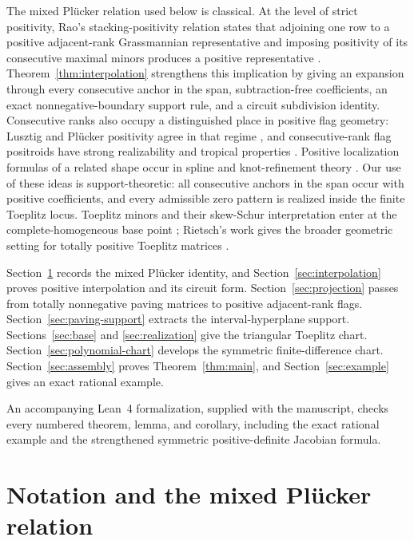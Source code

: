 \documentclass{amsart}
\numberwithin{equation}{section}
\theoremstyle{definition}
\theoremstyle{remark}
\begin{document}
The mixed Pl\"ucker relation used below is classical.  At the level of strict positivity, Rao's stacking-positivity relation states that adjoining one row to a positive adjacent-rank Grassmannian representative and imposing positivity of its consecutive maximal minors produces a positive representative \cite[Section~5.1]{Rao}.  Theorem~\ref{thm:interpolation} strengthens this implication by giving an expansion through every consecutive anchor in the span, subtraction-free coefficients, an exact nonnegative-boundary support rule, and a circuit subdivision identity.  Consecutive ranks also occupy a distinguished place in positive flag geometry: Lusztig and Pl\"ucker positivity agree in that regime \cite{BlochKarp}, and consecutive-rank flag positroids have strong realizability and tropical properties \cite{BEW}.  Positive localization formulas of a related shape occur in spline and knot-refinement theory \cite{deBoorDeVore,Lyche,Mazure}.  Our use of these ideas is support-theoretic: all consecutive anchors in the span occur with positive coefficients, and every admissible zero pattern is realized inside the finite Toeplitz locus.  Toeplitz minors and their skew-Schur interpretation enter at the complete-homogeneous base point \cite{GarciaTierz,Macdonald}; Rietsch's work gives the broader geometric setting for totally positive Toeplitz matrices \cite{Rietsch,RietschSurvey}.

Section~\ref{sec:plucker} records the mixed Pl\"ucker identity, and Section~\ref{sec:interpolation} proves positive interpolation and its circuit form.  Section~\ref{sec:projection} passes from totally nonnegative paving matrices to positive adjacent-rank flags.  Section~\ref{sec:paving-support} extracts the interval-hyperplane support.  Sections~\ref{sec:base} and \ref{sec:realization} give the triangular Toeplitz chart.  Section~\ref{sec:polynomial-chart} develops the symmetric finite-difference chart.  Section~\ref{sec:assembly} proves Theorem~\ref{thm:main}, and Section~\ref{sec:example} gives an exact rational example.

An accompanying Lean~4 formalization, supplied with the manuscript, checks every numbered theorem, lemma, and corollary, including the exact rational example and the strengthened symmetric positive-definite Jacobian formula.

\section{Notation and the mixed Pl\"ucker relation}\label{sec:plucker}
\end{document}
